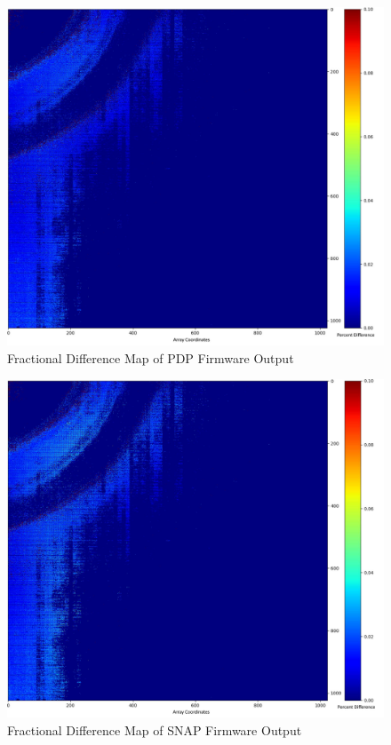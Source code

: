             \begin{figure}[t]
                \centering
                \includegraphics[width=1.0\textwidth]{fig/fractional_difference_pdp.jpg}
                \caption{Fractional Difference Map of PDP Firmware Output}
                \label{fig:fractional_difference_pdp}
            \end{figure}

            \begin{figure}[t]
                \centering
                \includegraphics[width=1.0\textwidth]{fig/fractional_difference_snap.jpg}
                \caption{Fractional Difference Map of SNAP Firmware Output}
                \label{fig:fractional_difference_snap}
            \end{figure}

